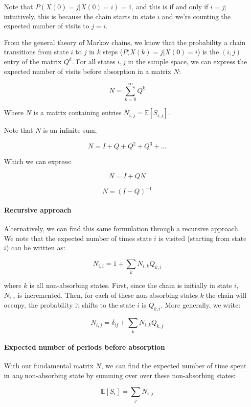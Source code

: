 \documentclass[11pt]{article}
\newcommand{\E}{\mathbb{E}}
\begin{document}
Note that $P(X(0) = j | X(0) = i) = 1$, and this is if and only if $i = j$;
intuitively, this is because the chain starts in state $i$ and we're counting
the expected number of visits to $j=i$.

From the general theory of Markov chains, we know that the probability a chain
transitions from state $i$ to $j$ in $k$ steps ($P(X(k) = j | X(0) = i$) is the
  $(i, j)$ entry of the matrix $Q^k$. For all states $i, j$ in the sample
  space, we can express the expected number of visits before absorption in a
  matrix $N$:

$$
N = \sum_{k=0}^{\infty} Q^k
$$

Where $N$ is a matrix containing entries $N_{i,j} = \E[S_{i,j}]$.

Note that $N$ is an infinite sum,

$$
N = I + Q + Q^2 + Q^3 + \ldots
$$

Which we can express: 

$$
N = I + QN
$$

$$
N = (I - Q)^{-1}
$$

\paragraph{Recursive approach} 

Alternatively, we can find this same formulation through a recursive approach.
We note that the expected number of times state $i$ is visited (starting from
state $i$) can be written as:

$$
N_{i,i} = 1 + \sum_k N_{i,k} Q_{k,i}
$$

where $k$ is all non-absorbing states. First, since the chain is initially in
state $i$, $N_{i,i}$ is incremented. Then, for each of these non-absorbing
states $k$ the chain will occupy, the probability it shifts to the state $i$ is
$Q_{k,i}$. More generally, we write:

$$
N_{i,j} = \delta_{ij} + \sum_k N_{i,k} Q_{k,j}
$$

\paragraph{Expected number of periods before absorption} 

With our fundamental matrix $N$, we can find the expected number of time spent
in \emph{any} non-absorbing state by summing over over these non-absorbing states:

$$
\E[S_i] = \sum_j N_{i,j}
$$




\printbibliography
\end{document}
